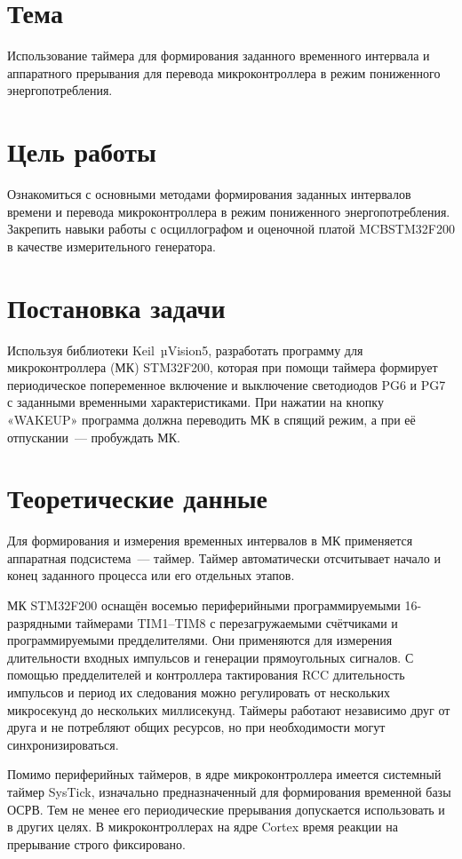 \documentclass[a4paper, final]{article}
\begin{document}
\section{Тема}
Использование таймера для формирования заданного временного интервала и аппаратного прерывания для перевода микроконтроллера в режим пониженного энергопотребления.

\section{Цель работы}
Ознакомиться с основными методами формирования заданных интервалов времени и перевода микроконтроллера в режим пониженного энергопотребления. Закрепить навыки работы с осциллографом и оценочной платой MCBSTM32F200 в качестве измерительного генератора.

\section{Постановка задачи}
Используя библиотеки Keil~µVision5, разработать программу для микроконтроллера (МК) STM32F200, которая при помощи таймера формирует периодическое попеременное включение и выключение светодиодов PG6 и PG7 с заданными временными характеристиками. При нажатии на кнопку «WAKEUP» программа должна переводить МК в спящий режим, а при её отпускании~--- пробуждать МК.

\section{Теоретические данные}

Для формирования и измерения временных интервалов в МК применяется аппаратная подсистема~--- таймер. Таймер автоматически отсчитывает начало и конец заданного процесса или его отдельных этапов.

МК STM32F200 оснащён восемью периферийными программируемыми 16-разрядными таймерами TIM1–TIM8 с перезагружаемыми счётчиками и программируемыми предделителями. Они применяются для измерения длительности входных импульсов и генерации прямоугольных сигналов. С помощью предделителей и контроллера тактирования RCC длительность импульсов и период их следования можно регулировать от нескольких микросекунд до нескольких миллисекунд. Таймеры работают независимо друг от друга и не потребляют общих ресурсов, но при необходимости могут синхронизироваться.

Помимо периферийных таймеров, в ядре микроконтроллера имеется системный таймер SysTick, изначально предназначенный для формирования временной базы ОСРВ. Тем не менее его периодические прерывания допускается использовать и в других целях. В микроконтроллерах на ядре Cortex время реакции на прерывание строго фиксировано.
\end{document}
